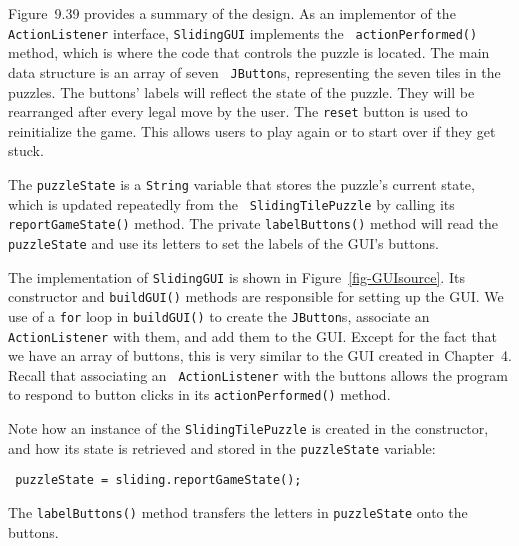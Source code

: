 Figure~9.39 provides a summary of the design. As an implementor of the
{\tt ActionListener} interface, {\tt SlidingGUI} implements the {\tt
actionPerformed()} method, which is where the code that controls the
puzzle is located.  The main data structure is an array of seven {\tt
JButton}s, representing the seven tiles in the puzzles. The buttons'
labels will reflect the state of the puzzle.  They will be rearranged
after every legal move by the user. The {\tt reset} button is used to
reinitialize the game. This allows users to play again or to start
over if they get stuck.

The {\tt puzzleState} is a {\tt String} variable that stores the
puzzle's current state, which is updated repeatedly from the {\tt
SlidingTilePuzzle} by calling its {\tt reportGameState()} method.  The
private {\tt labelButtons()} method will read the {\tt puzzleState}
and use its letters to set the labels of the GUI's buttons.

The implementation of {\tt SlidingGUI} is shown in
Figure~\ref{fig-GUIsource}.  Its constructor and {\tt buildGUI()}
methods are responsible for setting up the GUI. We use of a {\tt for}
loop in {\tt buildGUI()} to create the {\tt JButton}s, associate an
{\tt ActionListener} with them, and add them to the GUI. Except for
the fact that we have an array of buttons, this is very similar to the
GUI created in Chapter~4. Recall that associating an {\tt
ActionListener} with the buttons allows the program to respond to
button clicks in its {\tt actionPerformed()} method.

Note how an instance of the {\tt SlidingTilePuzzle} is created in
the constructor, and how its state is retrieved and stored in
the {\tt puzzleState} variable:

\begin{jjjlisting}
\begin{lstlisting}
 puzzleState = sliding.reportGameState();
\end{lstlisting}
\end{jjjlisting}

\noindent The {\tt labelButtons()} method transfers the
letters in {\tt puzzleState} onto the buttons.

